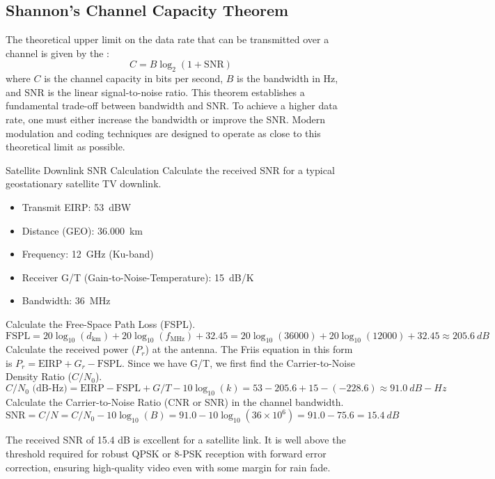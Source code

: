 \subsection{Shannon's Channel Capacity Theorem}

The theoretical upper limit on the data rate that can be transmitted over a channel is given by the :
\begin{equation}
    C = B \log_2(1 + \text{SNR})
\end{equation}
where $C$ is the channel capacity in bits per second, $B$ is the bandwidth in Hz, and SNR is the linear signal-to-noise ratio. This theorem establishes a fundamental trade-off between bandwidth and SNR. To achieve a higher data rate, one must either increase the bandwidth or improve the SNR. Modern modulation and coding techniques are designed to operate as close to this theoretical limit as possible.

\begin{workedexample}{Satellite Downlink SNR Calculation}
     Calculate the received SNR for a typical geostationary satellite TV downlink.
    \begin{itemize}
        \item Transmit EIRP: \qty{53}{dBW}
        \item Distance (GEO): \qty{36,000}{km}
        \item Frequency: \qty{12}{GHz} (Ku-band)
        \item Receiver G/T (Gain-to-Noise-Temperature): \qty{15}{dB/K}
        \item Bandwidth: \qty{36}{MHz}
    \end{itemize}
    \begin{derivationsteps}
        \step Calculate the Free-Space Path Loss (FSPL).
        \[ \text{FSPL} = 20\log_{10}(d_{\text{km}}) + 20\log_{10}(f_{\text{MHz}}) + 32.45 = 20\log_{10}(36000) + 20\log_{10}(12000) + 32.45 \approx \qty{205.6}{dB} \]
        \step Calculate the received power ($P_r$) at the antenna. The Friis equation in this form is $P_r = \text{EIRP} + G_r - \text{FSPL}$. Since we have G/T, we first find the Carrier-to-Noise Density Ratio ($C/N_0$).
        \[ C/N_0 \text{ (dB-Hz)} = \text{EIRP} - \text{FSPL} + G/T - 10\log_{10}(k) = 53 - 205.6 + 15 - (-228.6) \approx \qty{91.0}{dB-Hz} \]
        \step Calculate the Carrier-to-Noise Ratio (CNR or SNR) in the channel bandwidth.
        \[ \text{SNR} = C/N = C/N_0 - 10\log_{10}(B) = 91.0 - 10\log_{10}(36 \times 10^6) = 91.0 - 75.6 = \qty{15.4}{dB} \]
    \end{derivationsteps}
     The received SNR of 15.4 dB is excellent for a satellite link. It is well above the threshold required for robust QPSK or 8-PSK reception with forward error correction, ensuring high-quality video even with some margin for rain fade.
\end{workedexample}

